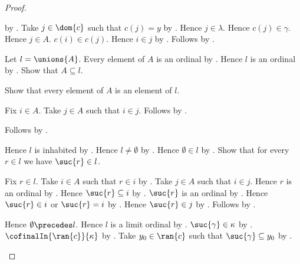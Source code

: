 \begin{proof}
\begin{subproof}
\begin{subproof}
\begin{subproof}
                    by .
                Take $j\in\dom{c}$ such that $c(j)=y$
                    by .
                Hence $j\in\lambda$.
                Hence $c(j)\in\gamma$.
                Hence $j\in A$.
                $c(i)\in c(j)$.
                Hence $i\in j$
                    by .
                Follows by \auto.
            \end{subproof}
            Let $l=\unions{A}$.
            Every element of $A$ is an ordinal
                by .
            Hence $l$ is an ordinal by .
            Show that $A\subseteq l$.
            \begin{subproof}
                Show that every element of $A$ is an element of $l$.
                \begin{subproof}
                    Fix $i\in A$.
                    Take $j\in A$ such that $i\in j$.
                    Follows by .
                \end{subproof}
                Follows by .
            \end{subproof}
            Hence $l$ is inhabited by \auto.
            Hence $l\neq\emptyset$ by .
            Hence $\emptyset\in l$
                by .
            Show that for every $r\in l$ we have $\suc{r}\in l$.
            \begin{subproof}
                Fix $r\in l$.
                Take $i\in A$ such that $r\in i$ by .
                Take $j\in A$ such that $i\in j$.
                Hence $r$ is an ordinal by .
                Hence $\suc{r}\subseteq i$ by .
                $\suc{r}$ is an ordinal by .
                Hence $\suc{r}\in i$ or $\suc{r}=i$
                    by .
                Hence $\suc{r}\in j$ by .
                Follows by .
            \end{subproof}
            Hence $\emptyset\precedes l$.
            Hence $l$ is a limit ordinal by .
            $\suc{\gamma}\in\kappa$ by .
            $\cofinalIn{\ran{c}}{\kappa}$ by .
            Take $y_0\in\ran{c}$ such that $\suc{\gamma}\subseteq y_0$
                by .

\end{subproof}
\end{subproof}
\end{proof}
